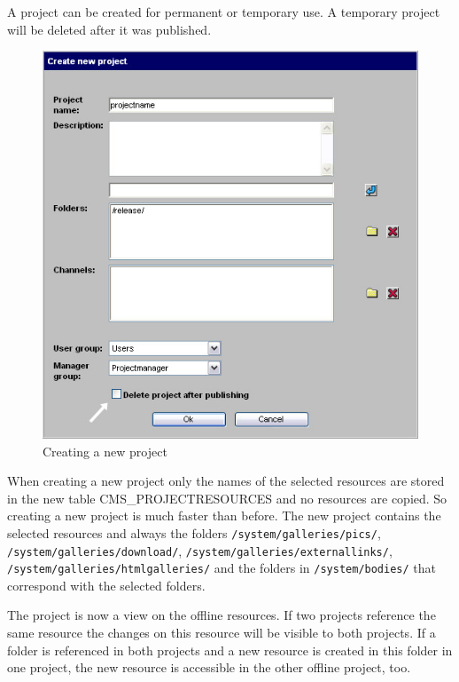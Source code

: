 A project can be created for permanent or temporary use. A
temporary project will be deleted after it was published.

\begin{figure}[hbt]
\begin{center}
\includegraphics[width=\sgw]
                   {pics/newProject/newPro01}
\caption[Creating a new project]
           {Creating a new project}
\label{newproject}
\end{center}
\end{figure}

When creating a new project only the names of the selected
resources are stored in the new table CMS\_PROJECTRESOURCES and no
resources are copied. So creating a new project is much faster
than before. The new project contains the selected resources and
always the folders \texttt{/system/galleries/pics/}, \texttt{/system/galleries/download/}, \linebreak
\texttt{/system/galleries/externallinks/}, \texttt{/system/galleries/htmlgalleries/} 
and  the folders in \texttt{/system/bodies/} that correspond with the selected folders.

The project is now a view on the offline resources. If two
projects reference the same resource the changes on this resource
will be visible to both projects. If a folder is referenced in
both projects and a new resource is created in this folder in one
project, the new resource is accessible in the other offline project, too.

